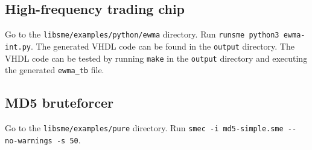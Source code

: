 \subsection{High-frequency trading chip}
Go to the {\tt libsme/examples/python/ewma} directory. Run {\tt runsme python3
  ewma-int.py}. The generated VHDL code can be found in the {\tt output}
directory. The VHDL code can be tested by running {\tt make} in the {\tt output}
directory and executing the generated {\tt ewma\_tb} file.

\subsection{MD5 bruteforcer}
Go to the {\tt libsme/examples/pure} directory. Run {\tt smec -i md5-simple.sme -{}-{}no-warnings -s 50}.


